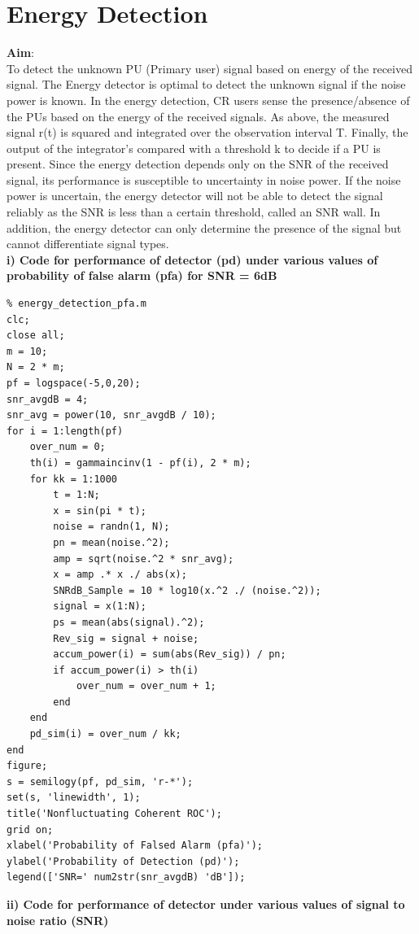 \documentclass[a4paper]{article}
\begin{document}
\section{Energy Detection}
\textbf{\large{Aim}}:\\[10pt]
To detect the unknown PU (Primary user) signal based on energy of the
received signal. The Energy detector is optimal to detect the unknown signal
if the noise power is known. In the energy detection, CR users sense the
presence/absence of the PUs based on the energy of the received signals. As
above, the measured signal r(t) is squared and integrated over the observation
interval T. Finally, the output of the integrator’s compared with a threshold k
to decide if a PU is present. Since the energy detection depends only on the
SNR of the received signal, its performance is susceptible to uncertainty in
noise power. If the noise power is uncertain, the energy detector will not be
able to detect the signal reliably as the SNR is less than a certain threshold,
called an SNR wall. In addition, the energy detector can only determine
the presence of the signal but cannot differentiate signal types. \\[10pt]
\textbf{i) Code for performance of detector (pd) under various values of probability
of false alarm (pfa) for SNR = 6dB}\\
\begin{verbatim}
% energy_detection_pfa.m
clc;
close all;
m = 10;
N = 2 * m;
pf = logspace(-5,0,20);
snr_avgdB = 4;
snr_avg = power(10, snr_avgdB / 10);
for i = 1:length(pf)
    over_num = 0;
    th(i) = gammaincinv(1 - pf(i), 2 * m);
    for kk = 1:1000
        t = 1:N;
        x = sin(pi * t);
        noise = randn(1, N);
        pn = mean(noise.^2);
        amp = sqrt(noise.^2 * snr_avg);
        x = amp .* x ./ abs(x);
        SNRdB_Sample = 10 * log10(x.^2 ./ (noise.^2));
        signal = x(1:N);
        ps = mean(abs(signal).^2);
        Rev_sig = signal + noise;
        accum_power(i) = sum(abs(Rev_sig)) / pn;
        if accum_power(i) > th(i)
            over_num = over_num + 1;
        end
    end
    pd_sim(i) = over_num / kk;
end
figure;
s = semilogy(pf, pd_sim, 'r-*');
set(s, 'linewidth', 1);
title('Nonfluctuating Coherent ROC');
grid on;
xlabel('Probability of Falsed Alarm (pfa)');
ylabel('Probability of Detection (pd)');
legend(['SNR=' num2str(snr_avgdB) 'dB']);
\end{verbatim}
\textbf{ii) Code for performance of detector under various values of signal to noise ratio (SNR)}\\
\end{document}
